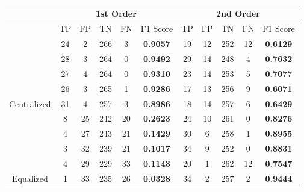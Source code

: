 \documentclass[10pt,a4paper]{article}
\begin{document}
		\begin{table}[!h]
			\centering
			\begin{tabular}{|c|c|c|c|c|c|c|c|c|c|c|}
				\hline
				& \multicolumn{5}{c|}{1st Order}                                                     & \multicolumn{5}{c|}{2nd Order}                              \\ \hline
				& TP & FP & TN  & FN                        & F1 Score                               & TP & FP & TN  & FN & F1 Score                               \\ \hline
				& 24 & 2  & 266 & {\color[HTML]{333333} 3}  & {\color[HTML]{FE0000} \textbf{0.9057}} & 19 & 12 & 252 & 12 & {\color[HTML]{FE0000} \textbf{0.6129}} \\ \cline{2-11} 
				& 28 & 3  & 264 & {\color[HTML]{333333} 0}  & {\color[HTML]{FE0000} \textbf{0.9492}} & 29 & 14 & 248 & 4  & {\color[HTML]{FE0000} \textbf{0.7632}} \\ \cline{2-11} 
				& 27 & 4  & 264 & {\color[HTML]{333333} 0}  & {\color[HTML]{FE0000} \textbf{0.9310}} & 23 & 14 & 253 & 5  & {\color[HTML]{FE0000} \textbf{0.7077}} \\ \cline{2-11} 
				& 26 & 3  & 265 & {\color[HTML]{333333} 1}  & {\color[HTML]{FE0000} \textbf{0.9286}} & 17 & 13 & 256 & 9  & {\color[HTML]{FE0000} \textbf{0.6071}} \\ \cline{2-11} 
				\multirow{-5}{*}{Centralized} & 31 & 4  & 257 & {\color[HTML]{333333} 3}  & {\color[HTML]{FE0000} \textbf{0.8986}} & 18 & 14 & 257 & 6  & {\color[HTML]{FE0000} \textbf{0.6429}} \\ \hline
				& 8  & 25 & 242 & {\color[HTML]{333333} 20} & {\color[HTML]{FE0000} \textbf{0.2623}} & 24 & 10 & 261 & 0  & {\color[HTML]{FE0000} \textbf{0.8276}} \\ \cline{2-11} 
				& 4  & 27 & 243 & {\color[HTML]{333333} 21} & {\color[HTML]{FE0000} \textbf{0.1429}} & 30 & 6  & 258 & 1  & {\color[HTML]{FE0000} \textbf{0.8955}} \\ \cline{2-11} 
				& 3  & 32 & 239 & {\color[HTML]{333333} 21} & {\color[HTML]{FE0000} \textbf{0.1017}} & 34 & 9  & 252 & 0  & {\color[HTML]{FE0000} \textbf{0.8831}} \\ \cline{2-11} 
				& 4  & 29 & 229 & {\color[HTML]{333333} 33} & {\color[HTML]{FE0000} \textbf{0.1143}} & 20 & 1  & 262 & 12 & {\color[HTML]{FE0000} \textbf{0.7547}} \\ \cline{2-11} 
				\multirow{-5}{*}{Equalized}   & 1  & 33 & 235 & {\color[HTML]{333333} 26} & {\color[HTML]{FE0000} \textbf{0.0328}} & 34 & 2  & 257 & 2  & {\color[HTML]{FE0000} \textbf{0.9444}} \\ \hline
			\end{tabular}
		\end{table}
		
\end{document}
